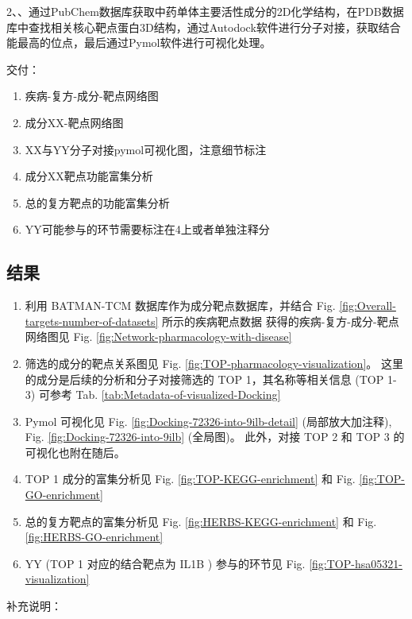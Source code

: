 \documentclass[
]{article}
\providecommand{\tightlist}{%
  \setlength{\itemsep}{0pt}\setlength{\parskip}{0pt}}
\begin{document}
2、、通过PubChem数据库获取中药单体主要活性成分的2D化学结构，在PDB数据库中查找相关核心靶点蛋白3D结构，通过Autodock软件进行分子对接，获取结合能最高的位点，最后通过Pymol软件进行可视化处理。

交付：

\begin{enumerate}
\def\labelenumi{\arabic{enumi}.}
\tightlist
\item
  疾病-复方-成分-靶点网络图
\item
  成分XX-靶点网络图
\item
  XX与YY分子对接pymol可视化图，注意细节标注
\item
  成分XX靶点功能富集分析
\item
  总的复方靶点的功能富集分析
\item
  YY可能参与的环节需要标注在4上或者单独注释分
\end{enumerate}

\hypertarget{ux7ed3ux679c}{%
\subsection{结果}\label{ux7ed3ux679c}}

\begin{enumerate}
\def\labelenumi{\arabic{enumi}.}
\tightlist
\item
  利用 BATMAN-TCM 数据库作为成分靶点数据库，并结合 Fig. \ref{fig:Overall-targets-number-of-datasets} 所示的疾病靶点数据
  获得的疾病-复方-成分-靶点网络图见 Fig. \ref{fig:Network-pharmacology-with-disease}
\item
  筛选的成分的靶点关系图见 Fig. \ref{fig:TOP-pharmacology-visualization}。
  这里的成分是后续的分析和分子对接筛选的 TOP 1，其名称等相关信息 (TOP 1-3) 可参考 Tab. \ref{tab:Metadata-of-visualized-Docking}
\item
  Pymol 可视化见 Fig. \ref{fig:Docking-72326-into-9ilb-detail} (局部放大加注释),
  Fig. \ref{fig:Docking-72326-into-9ilb} (全局图)。
  此外，对接 TOP 2 和 TOP 3 的可视化也附在随后。
\item
  TOP 1 成分的富集分析见 Fig. \ref{fig:TOP-KEGG-enrichment} 和 Fig. \ref{fig:TOP-GO-enrichment}
\item
  总的复方靶点的富集分析见 Fig. \ref{fig:HERBS-KEGG-enrichment} 和 Fig. \ref{fig:HERBS-GO-enrichment}
\item
  YY (TOP 1 对应的结合靶点为 IL1B ) 参与的环节见
  Fig. \ref{fig:TOP-hsa05321-visualization}
\end{enumerate}

补充说明：
\end{document}
